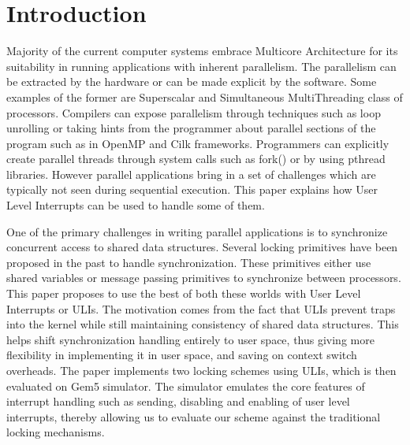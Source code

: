 \section{Introduction}
Majority of the current computer systems embrace Multicore Architecture for its
suitability in running applications with inherent parallelism.
The parallelism can be extracted by the hardware or can be made explicit by the
software. Some examples of the former are Superscalar and Simultaneous
MultiThreading class of processors. Compilers can expose parallelism through
techniques such as loop unrolling or taking hints from the programmer about
parallel sections of the program such as in OpenMP and Cilk frameworks.
Programmers can explicitly create parallel threads through system calls such as
fork() or by using pthread libraries. However parallel applications bring
in a set of challenges which are typically not seen during sequential execution.
This paper explains how User Level Interrupts can be used to handle some of them.

One of the primary challenges in writing parallel applications is to synchronize
concurrent access to shared data structures. Several locking primitives have
been proposed in the past to handle synchronization. These primitives either
use shared variables or message passing primitives to synchronize between
processors. This paper proposes to use the best of both these worlds with User
Level Interrupts or ULIs. The motivation comes from the fact that ULIs prevent
traps into the kernel while still maintaining consistency of shared data
structures. This helps shift synchronization handling entirely to user space,
thus giving more flexibility in implementing it in user space,
and saving on context switch overheads. The paper implements two locking schemes
using ULIs, which is then evaluated on Gem5 simulator. The simulator emulates
the core features of interrupt handling such as sending, disabling and enabling
of user level interrupts, thereby allowing us to evaluate our scheme against the
traditional locking mechanisms.

